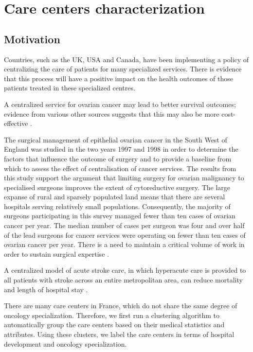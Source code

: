\chapter{Care centers characterization}

\section{Motivation}

Countries, such as the UK, USA and Canada, have been implementing a policy of centralizing the care of patients for many specialized services. There is evidence that this process will have a positive impact on the health outcomes of those patients treated in these specialized centres.

A centralized service for ovarian cancer may lead to better survival outcomes; evidence from various other sources suggests that this may also be more cost-effective \cite{woo_centralisation_2012}.

The surgical management of epithelial ovarian cancer in the South West of England was studied in the two years 1997 and 1998 in order to determine the factors that influence the outcome of surgery and to provide a baseline from which to assess the effect of centralisation of cancer services. The results from this study support the argument that limiting surgery for ovarian malignancy to specialised surgeons improves the extent of cytoreductive surgery. The large expanse of rural and sparsely populated land means that there are several hospitals serving relatively small populations. Consequently, the majority of surgeons participating in this survey managed fewer than ten cases of ovarian cancer per year. The median number of cases per surgeon was four and over half of the lead surgeons for cancer services were operating on fewer than ten cases of ovarian cancer per year. There is a need to maintain a critical volume of work in order to sustain surgical expertise \cite{olaitan_surgical_2001}.

A centralized model of acute stroke care, in which hyperacute care is provided to all patients with stroke across an entire metropolitan area, can reduce mortality and length of hospital stay \cite{morris_impact_2014}.

There are many care centers in France, which do not share the same degree of oncology specialization. Therefore, we first run a clustering algorithm to automatically group the care centers based on their medical statistics and attributes. Using these clusters, we label the care centers in terms of hospital development and oncology specialization.

